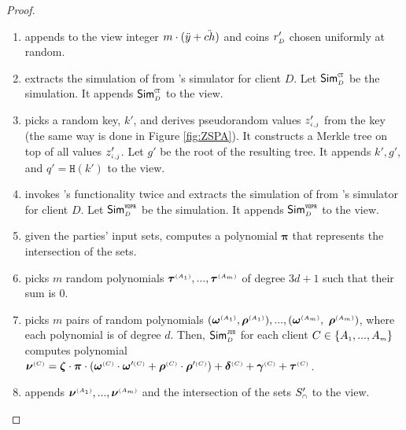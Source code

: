 \begin{proof}
\begin{enumerate}
\item appends to the view integer $m\cdot(\ddot{y}+\ddot{ch})$   and coins $r'_{\scriptscriptstyle D}$ chosen uniformly at random. 
%
\item extracts the simulation of \ct from \ct's simulator for client $D$. Let $\mathsf{Sim}^{\scriptscriptstyle \mathtt{CT}}_{\scriptscriptstyle D}$ be the simulation. It appends $\mathsf{Sim}^{\scriptscriptstyle \mathtt{CT}}_{\scriptscriptstyle D}$ to the view. 
%
\item picks a random key, $  k'$, and derives pseudorandom values $z'_{\scriptscriptstyle i,j}$ from the key (the same way is done in Figure \ref{fig:ZSPA}). It constructs a Merkle tree on top of all values $z'_{\scriptscriptstyle i, j}$. Let $g'$ be the root of the resulting tree. It appends $  k', g'$, and $q'=\mathtt{H}(  k')$ to the view. 
%
\item invokes \vopr's functionality twice and extracts the simulation of \vopr from \vopr's simulator for client $D$. Let $\mathsf{Sim}^{\scriptscriptstyle \mathtt{VOPR}}_{\scriptscriptstyle D}$ be the simulation. It appends $\mathsf{Sim}^{\scriptscriptstyle \mathtt{VOPR}}_{\scriptscriptstyle D}$ to the view.  
%
\item given the parties' input sets, computes a polynomial $ {\bm\pi}$ that represents the intersection of the sets. 

\item picks $m$ random polynomials $ {\bm\tau}^{\scriptscriptstyle (A_1)}, ...,  {\bm\tau}^{\scriptscriptstyle (A_m)}$ of degree $3d+1$ such that their sum is $0$.  


\item picks $m$ pairs of random polynomials $( {\bm\omega}^{\scriptscriptstyle (A_1)},  {\bm\rho}^{\scriptscriptstyle (A_1)}),..., ( {\bm\omega}^{\scriptscriptstyle (A_m)},$ $  {\bm\rho}^{\scriptscriptstyle (A_m)})$, where each polynomial is of degree $d$. Then, $\mathsf{Sim}^{\scriptscriptstyle \mathtt{JUS}}_{\scriptscriptstyle D}$ for each client $C\in  \{  {  A}_{ \scriptscriptstyle {   1}}, ...,   {  A}_{ \scriptscriptstyle {   m}}\} $ computes polynomial $ {\bm\nu}^{\scriptscriptstyle (C)}= {\bm\zeta}\cdot {\bm\pi}\cdot(  {\bm\omega}^{\scriptscriptstyle (C)}\cdot  {\bm\omega}'^{\scriptscriptstyle (C)}+  {\bm\rho}^{\scriptscriptstyle (C)}\cdot  {\bm\rho}'^{\scriptscriptstyle (C)})+ {\bm\delta}^{\scriptscriptstyle (C)}+ {\bm\gamma}^{\scriptscriptstyle(C)}+  {\bm\tau}^{ \scriptscriptstyle {  {(C)}}}$. 
%
\item appends $ {\bm\nu}^{\scriptscriptstyle (A_1)},...,  {\bm\nu}^{\scriptscriptstyle (A_m)}$ and the intersection of the sets $S'_{\scriptscriptstyle \cap}$ to the view. 
%
\end{enumerate}

  \vspace{-2mm}


\end{proof}
